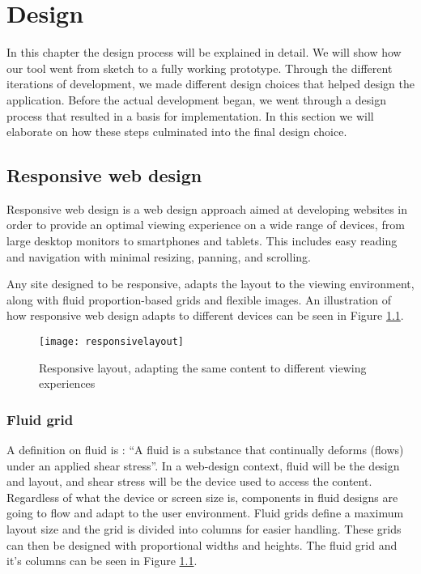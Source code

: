\chapter{Design}
\label{chap:design}
In this chapter the design process will be explained in detail. We will show how our tool went from sketch to a fully working prototype. 
Through the different iterations of development, we made different design choices that helped design the application. Before the actual development began, we went
through a design process that resulted in a basis for implementation. In this section we will elaborate on how these steps culminated into the final design choice.
\section{Responsive web design}
Responsive web design\citep{responsivearticle} is a web design approach aimed at developing websites in order to provide an optimal viewing experience on a wide range of devices, from large desktop monitors to smartphones and tablets. This includes easy reading and navigation with minimal resizing, panning, and scrolling.

Any site designed to be responsive, adapts the layout to the viewing environment, along with fluid proportion-based grids and flexible images. An illustration of how responsive web design adapts to different devices can be seen in Figure \ref{responsivelayout}. 

\begin{figure}[H]
\centering
	\texttt{[image: responsivelayout]}
\caption{Responsive layout, adapting the same content to different viewing experiences \citep{responsivelayout}}
\label{responsivelayout}
\end{figure}

\subsection{Fluid grid}
A definition on fluid is : ``A fluid is a substance that continually deforms (flows) under an applied shear stress''\citep{fluidgrid}. In a web-design context, fluid will be the design and layout, and shear stress will be the device used to access the content.
Regardless of what the device or screen size is, components in fluid designs are going to flow and adapt to the user environment. Fluid grids define a maximum layout size and the grid is divided into columns for easier handling. These grids can then be designed with proportional widths and heights. The fluid grid and it's columns can be seen in Figure \ref{responsivelayout}.

